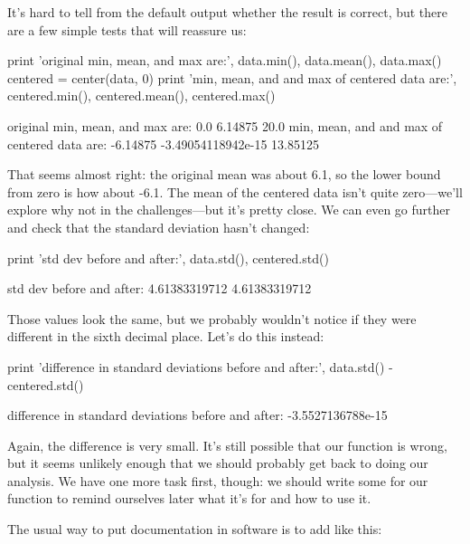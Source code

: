 It's hard to tell from the default output whether the result is correct,
but there are a few simple tests that will reassure us:

\begin{VerbIn}
print 'original min, mean, and max are:', data.min(), data.mean(), data.max()
centered = center(data, 0)
print 'min, mean, and and max of centered data are:', centered.min(), centered.mean(), centered.max()
\end{VerbIn}

\begin{VerbOut}
original min, mean, and max are: 0.0 6.14875 20.0
min, mean, and and max of centered data are: -6.14875 -3.49054118942e-15 13.85125
\end{VerbOut}

That seems almost right: the original mean was about 6.1, so the lower
bound from zero is how about -6.1. The mean of the centered data isn't
quite zero---we'll explore why not in the challenges---but it's pretty
close. We can even go further and check that the standard deviation
hasn't changed:

\begin{VerbIn}
print 'std dev before and after:', data.std(), centered.std()
\end{VerbIn}

\begin{VerbOut}
std dev before and after: 4.61383319712 4.61383319712
\end{VerbOut}

Those values look the same, but we probably wouldn't notice if they were
different in the sixth decimal place. Let's do this instead:

\begin{VerbIn}
print 'difference in standard deviations before and after:', data.std() - centered.std()
\end{VerbIn}

\begin{VerbOut}
difference in standard deviations before and after: -3.5527136788e-15
\end{VerbOut}

Again, the difference is very small. It's still possible that our
function is wrong, but it seems unlikely enough that we should probably
get back to doing our analysis. We have one more task first, though: we
should write some  for our
function to remind ourselves later what it's for and how to use it.

The usual way to put documentation in software is to add
 like this:

